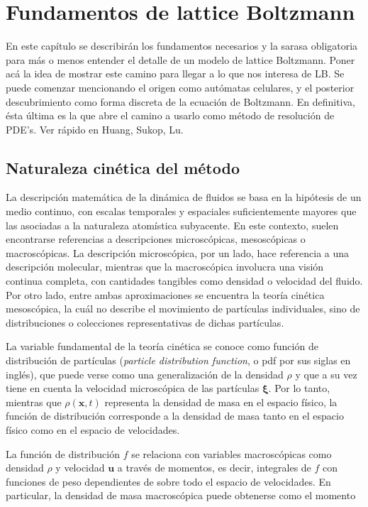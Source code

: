 \chapter{Fundamentos de lattice Boltzmann}

En este cap\'itulo se describir\'an los fundamentos necesarios y la sarasa obligatoria para m\'as o menos entender el detalle de un modelo de lattice Boltzmann.
Poner ac\'a la idea de mostrar este camino para llegar a lo que nos interesa de LB. Se puede comenzar mencionando el origen como aut\'omatas celulares, y el posterior descubrimiento como forma discreta de la ecuaci\'on de Boltzmann. En definitiva, \'esta \'ultima es la que abre el camino a usarlo como m\'etodo de resoluci\'on de PDE's. Ver r\'apido en Huang, Sukop, Lu.

\section{Naturaleza cin\'etica del m\'etodo}
\label{sec:kinetic}
La descripci\'on matem\'atica de la din\'amica de fluidos se basa en la hip\'otesis de un medio continuo, con escalas temporales y espaciales suficientemente mayores que las asociadas a la naturaleza atom\'istica subyacente. En este contexto, suelen encontrarse referencias a descripciones microsc\'opicas, mesosc\'opicas o macrosc\'opicas. La descripci\'on microsc\'opica, por un lado, hace referencia a una descripci\'on molecular, mientras que la macrosc\'opica involucra una visi\'on continua completa, con cantidades tangibles como densidad o velocidad del fluido. Por otro lado, entre ambas aproximaciones se encuentra la teor\'ia cin\'etica mesosc\'opica, la cu\'al no describe el movimiento de part\'iculas individuales, sino de distribuciones o colecciones representativas de dichas part\'iculas.
\par
La variable fundamental de la teor\'ia cin\'etica se conoce como funci\'on de distribuci\'on de part\'iculas (\emph{particle distribution function}, o pdf por sus siglas en ingl\'es), que puede verse como una generalizaci\'on de la densidad $\rho$ y que a su vez tiene en cuenta la velocidad microsc\'opica de las part\'iculas $\bm{\xi}$. Por lo tanto, mientras que $\rho(\bm{x},t)$ representa la densidad de masa en el espacio f\'isico, la funci\'on de distribuci\'on \fvar{} corresponde a la densidad de masa tanto en el espacio f\'isico como en el espacio de velocidades.
\par
La funci\'on de distribuci\'on $f$ se relaciona con variables macrosc\'opicas como densidad $\rho$ y velocidad $\bm{u}$ a trav\'es de momentos, es decir, integrales de $f$ con funciones de peso dependientes de \bxi{} sobre todo el espacio de velocidades. En particular, la densidad de masa macrosc\'opica puede obtenerse como el momento

